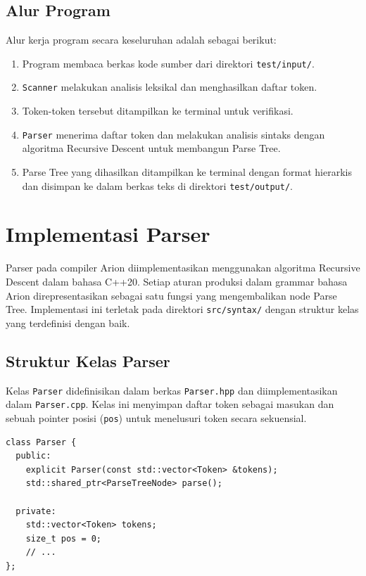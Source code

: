 \documentclass[12pt,a4paper]{article}
\begin{document}
\subsection{Alur Program}

Alur kerja program secara keseluruhan adalah sebagai berikut:
\begin{enumerate}
    \item Program membaca berkas kode sumber dari direktori \texttt{test/input/}.
    \item \texttt{Scanner} melakukan analisis leksikal dan menghasilkan daftar token.
    \item Token-token tersebut ditampilkan ke terminal untuk verifikasi.
    \item \texttt{Parser} menerima daftar token dan melakukan analisis sintaks dengan algoritma Recursive Descent untuk membangun Parse Tree.
    \item Parse Tree yang dihasilkan ditampilkan ke terminal dengan format hierarkis dan disimpan ke dalam berkas teks di direktori \texttt{test/output/}.
\end{enumerate}

\section{Implementasi Parser}

Parser pada compiler Arion diimplementasikan menggunakan algoritma Recursive Descent dalam bahasa C++20. Setiap aturan produksi dalam grammar bahasa Arion direpresentasikan sebagai satu fungsi yang mengembalikan node Parse Tree. Implementasi ini terletak pada direktori \texttt{src/syntax/} dengan struktur kelas yang terdefinisi dengan baik.

\subsection{Struktur Kelas Parser}

Kelas \texttt{Parser} didefinisikan dalam berkas \texttt{Parser.hpp} dan diimplementasikan dalam \texttt{Parser.cpp}. Kelas ini menyimpan daftar token sebagai masukan dan sebuah pointer posisi (\texttt{pos}) untuk menelusuri token secara sekuensial.

\begin{lstlisting}[style=cpp, caption={Deklarasi kelas Parser}]
class Parser {
  public:
    explicit Parser(const std::vector<Token> &tokens);
    std::shared_ptr<ParseTreeNode> parse();

  private:
    std::vector<Token> tokens;
    size_t pos = 0;
    // ...
};
\end{lstlisting}
\end{document}
